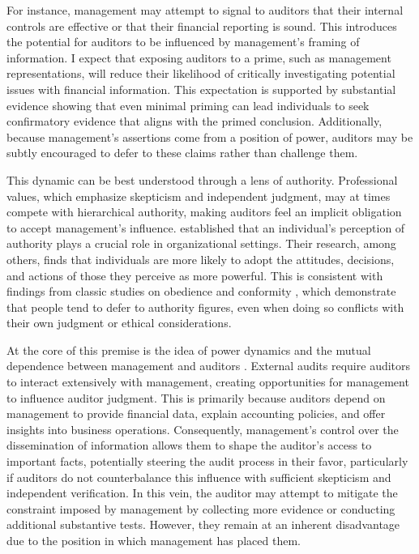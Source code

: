\documentclass[12pt,english]{article}
\begin{document}
For instance, management may attempt to signal to auditors that their internal controls are effective or that their financial reporting is sound. This introduces the potential for auditors to be influenced by management’s framing of information. I expect that exposing auditors to a prime, such as management representations, will reduce their likelihood of critically investigating potential issues with financial information. This expectation is supported by substantial evidence showing that even minimal priming can lead individuals to seek confirmatory evidence that aligns with the primed conclusion. Additionally, because management’s assertions come from a position of power, auditors may be subtly encouraged to defer to these claims rather than challenge them.

This dynamic can be best understood through a lens of authority. Professional values, which emphasize skepticism and independent judgment, may at times compete with hierarchical authority, making auditors feel an implicit obligation to accept management’s influence. \citet{lippitt1952} established that an individual’s perception of authority plays a crucial role in organizational settings. Their research, among others, finds that individuals are more likely to adopt the attitudes, decisions, and actions of those they perceive as more powerful. This is consistent with findings from classic studies on obedience and conformity \citep{asch2016, milgram1974, burger2009}, which demonstrate that people tend to defer to authority figures, even when doing so conflicts with their own judgment or ethical considerations.

At the core of this premise is the idea of power dynamics and the mutual dependence between management and auditors \citep{casciaro2005}. External audits require auditors to interact extensively with management, creating opportunities for management to influence auditor judgment. This is primarily because auditors depend on management to provide financial data, explain accounting policies, and offer insights into business operations. Consequently, management’s control over the dissemination of information allows them to shape the auditor’s access to important facts, potentially steering the audit process in their favor, particularly if auditors do not counterbalance this influence with sufficient skepticism and independent verification. In this vein, the auditor may attempt to mitigate the constraint imposed by management by collecting more evidence or conducting additional substantive tests. However, they remain at an inherent disadvantage due to the position in which management has placed them. 
\end{document}
